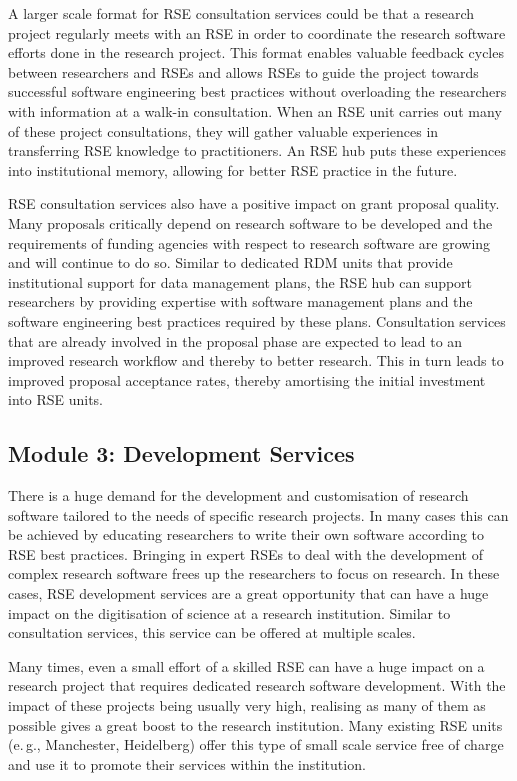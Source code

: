 \documentclass[10pt,letterpaper]{article}
\newcommand*{\eg}{e.\,g.,\xspace}
\begin{document}
A larger scale format for RSE consultation services could be that a research project regularly meets with an RSE in order to coordinate the research software efforts done in the research project.
This format enables valuable feedback cycles between researchers and RSEs and allows RSEs to guide the project towards successful software engineering best practices without overloading the researchers with information at a walk-in consultation.
When an RSE unit carries out many of these project consultations, they will gather valuable experiences in transferring RSE knowledge to practitioners.
An RSE hub puts these experiences into institutional memory, allowing for better RSE practice in the future.

RSE consultation services also have a positive impact on grant proposal quality.
Many proposals critically depend on research software to be developed and the requirements of funding agencies with respect to research software are growing and will continue to do so.
Similar to dedicated RDM units that provide institutional support for data management plans, the RSE hub can support researchers by providing expertise with software management plans and the software engineering best practices required by these plans.
Consultation services that are already involved in the proposal phase are expected to lead to an improved research workflow and thereby to better research.
This in turn leads to improved proposal acceptance rates, thereby amortising the initial investment into RSE units.


\subsection*{Module 3: Development Services}%
\label{sec:development}

There is a huge demand for the development and customisation of research software tailored to the needs of specific research projects.
In many cases this can be achieved by educating researchers to write their own software according to RSE best practices.
Bringing in expert RSEs to deal with the development of complex research software frees up the researchers to focus on research.
In these cases, RSE development services are a great opportunity that can have a huge impact on the digitisation of science at a research institution.
Similar to consultation services, this service can be offered at multiple scales.

Many times, even a small effort of a skilled RSE can have a huge impact on a research project that requires dedicated research software development.
With the impact of these projects being usually very high, realising as many of them as possible gives a great boost to the research institution.
Many existing RSE units (\eg{} Manchester, Heidelberg) offer this type of small scale service free of charge and use it to promote their services within the institution.
\end{document}
